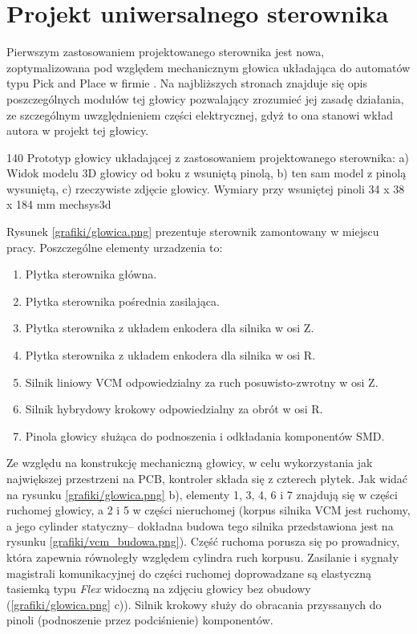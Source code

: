 \section{Projekt uniwersalnego sterownika}

Pierwszym zastosowaniem projektowanego sterownika jest nowa, zoptymalizowana pod względem mechanicznym głowica układająca do automatów typu Pick and Place w firmie \firma{}. Na najbliższych stronach znajduje się opis poszczególnych modułów tej głowicy pozwalający zrozumieć jej zasadę działania, ze szczególnym uwzględnieniem części elektrycznej, gdyż to ona stanowi wkład autora w projekt tej głowicy.

	{140}
	{Prototyp głowicy układającej z zastosowaniem projektowanego sterownika: a) Widok modelu 3D głowicy od boku z wsuniętą pinolą, b) ten sam model z pinolą wysuniętą, c) rzeczywiste zdjęcie głowicy. Wymiary przy wsuniętej pinoli 34 x 38 x 184 mm}
	{mechsys3d}

Rysunek \ref{grafiki/glowica.png} prezentuje sterownik zamontowany w miejscu pracy. Poszczególne elementy urzadzenia to:

\begin{enumerate}
	\item Płytka sterownika główna.
	\item Płytka sterownika pośrednia zasilająca.
	\item Płytka sterownika z układem enkodera dla silnika w osi Z.
	\item Płytka sterownika z układem enkodera dla silnika w osi R.
	\item Silnik liniowy VCM odpowiedzialny za ruch posuwisto-zwrotny w osi Z.
	\item Silnik hybrydowy krokowy odpowiedzialny za obrót w osi R.
	\item Pinola głowicy służąca do podnoszenia i odkładania komponentów SMD.
\end{enumerate}

Ze względu na konstrukcję mechaniczną głowicy, w celu wykorzystania jak największej przestrzeni na PCB, kontroler składa się z czterech płytek. Jak widać na rysunku \ref{grafiki/glowica.png} b), elementy 1, 3, 4, 6 i 7 znajdują się w części ruchomej głowicy, a 2 i 5 w części nieruchomej (korpus silnika VCM jest ruchomy, a jego cylinder statyczny-- dokładna budowa tego silnika przedstawiona jest na rysunku \ref{grafiki/vcm_budowa.png}). Część ruchoma porusza się po prowadnicy, która zapewnia równoległy względem cylindra ruch korpusu. Zasilanie i sygnały magistrali komunikacyjnej do części ruchomej doprowadzane są elastyczną tasiemką typu {\it Flex} widoczną na zdjęciu głowicy bez obudowy (\ref{grafiki/glowica.png} c)). Silnik krokowy służy do obracania przyssanych do pinoli (podnoszenie przez podciśnienie) komponentów. \\

